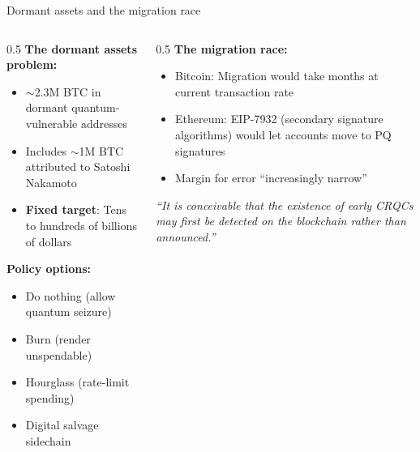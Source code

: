 \ifdefined\PRESENTATION\else\PassOptionsToClass{handout}{beamer}\fi\documentclass[aspectratio=169, lualatex]{beamer}
\begin{document}
\begin{frame}{Dormant assets and the migration race}
	\vspace{-1mm}
	\begin{columns}[c]
		\begin{column}{0.5\textwidth}
			\textbf{The dormant assets problem:}
			\begin{itemize}
				\item $\sim$2.3M BTC in dormant quantum-vulnerable addresses
				\item Includes $\sim$1M BTC attributed to Satoshi Nakamoto
				\item \textbf{Fixed target}: Tens to hundreds of billions of dollars
			\end{itemize}
			\textbf{Policy options:}
			\begin{itemize}
				\item Do nothing (allow quantum seizure)
				\item Burn (render unspendable)
				\item Hourglass (rate-limit spending)
				\item Digital salvage sidechain
			\end{itemize}
		\end{column}
		\begin{column}{0.5\textwidth}
			\textbf{The migration race:}
			\begin{itemize}
				\item Bitcoin: Migration would take months at current transaction rate
				\item Ethereum: EIP-7932 (secondary signature algorithms) would let accounts move to PQ signatures
				\item Margin for error ``increasingly narrow''
			\end{itemize}
			{\small\textit{``It is conceivable that the existence of early CRQCs may first be detected on the blockchain rather than announced.''}}
		\end{column}
	\end{columns}
\end{frame}
\end{document}
